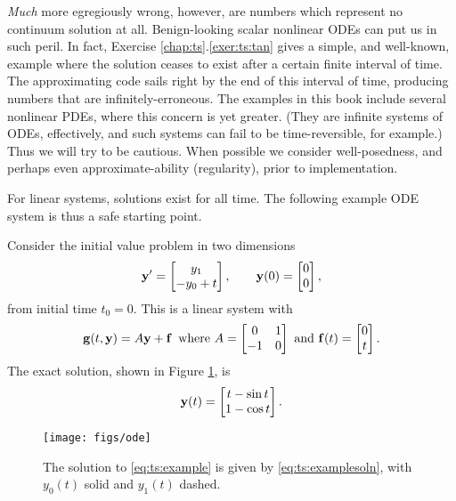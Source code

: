 \emph{Much} more egregiously wrong, however, are numbers which represent no continuum solution at all.  Benign-looking scalar nonlinear ODEs can put us in such peril.  In fact, Exercise \ref{chap:ts}.\ref{exer:ts:tan} gives a simple, and well-known, example where the solution ceases to exist after a certain finite interval of time.  The approximating code sails right by the end of this interval of time, producing numbers that are infinitely-erroneous.  The examples in this book include several nonlinear PDEs, where this concern is yet greater.  (They are infinite systems of ODEs, effectively, and such systems can fail to be time-reversible, for example.)  Thus we will try to be cautious.  When possible we consider well-posedness, and perhaps even approximate-ability (regularity), prior to implementation.

For linear systems, solutions exist for all time.  The following example ODE system is thus a safe starting point.

\noindent\hrulefill
\begin{example}  Consider the initial value problem in two dimensions
\begin{equation}
   \mathbf{y}' = \begin{bmatrix} y_1 \\ - y_0 + t\end{bmatrix}, \qquad \mathbf{y}(0) = \begin{bmatrix} 0 \\ 0 \end{bmatrix}, \label{eq:ts:example}
\end{equation}
from initial time $t_0=0$.  This is a linear system with
    $$\mathbf{g}(t,\mathbf{y}) = A \mathbf{y} + \mathbf{f} \,\text{ where } A = \begin{bmatrix} 0 & 1 \\ -1 & 0 \end{bmatrix} \text{ and } \mathbf{f}(t) = \begin{bmatrix} 0 \\ t\end{bmatrix}.$$
The exact solution, shown in Figure \ref{fig:ts:ode}, is
\begin{equation}
    \mathbf{y}(t) = \begin{bmatrix} t - \sin t \\ 1 - \cos t \end{bmatrix}.\label{eq:ts:examplesoln}
\end{equation}

\vspace{-3mm}
\begin{figure}
\texttt{[image: figs/ode]}
\caption{The solution to \eqref{eq:ts:example} is given by \eqref{eq:ts:examplesoln}, with $y_0(t)$ solid and $y_1(t)$ dashed.}
\label{fig:ts:ode}
\end{figure}
\end{example}
\vspace{-5mm}
\noindent\hrulefill


